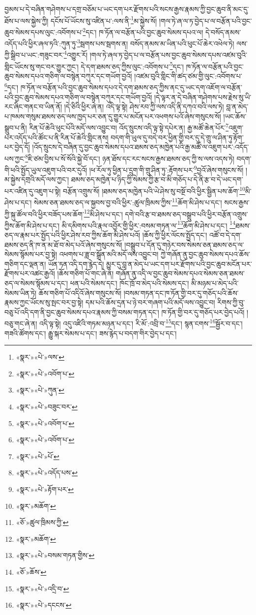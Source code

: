 བྱམས་པ་དེ་བཞིན་གཤེགས་པ་དགྲ་བཅོམ་པ་ཡང་དག་པར་རྫོགས་པའི་སངས་རྒྱས་རྣམས་ཀྱི་བྱང་ཆུབ་ནི་མང་དུ་ཐོས་པ་ལས་སྐྱེས་ཀྱི། དངོས་པོ་ཡོངས་སུ་འཛིན་པ་:ལས་ནི་\footnote{«སྣར་»«པེ་»ལས་}མ་སྐྱེས་སོ། །གལ་ཏེ་ཞ་ལ་ཏ་བྱེད་པ་ལ་བརྩོན་པའི་བྱང་ཆུབ་སེམས་དཔས་ལུང་:འབོགས་པ་\footnote{«སྣར་»«པེ་»འབོག་པ་}དང་། ཁ་ཏོན་ལ་བརྩོན་པའི་བྱང་ཆུབ་སེམས་དཔའ་ལ། དེ་བསོད་ནམས་འདོད་པའི་ཕྱིར་ཞལ་ཏའི་:ཀུན་ཏུ་\footnote{«སྣར་»«པེ་»ཀུན་}སྦགས་པས་སྦགས་ན། བསོད་ནམས་མ་ཡིན་པའི་ཕུང་པོ་ཆེར་འཕེལ་ཏེ། ལས་ཀྱི་སྒྲིབ་པ་ཡང་:གཟུང་བར་\footnote{«སྣར་»«པེ་»བཟུང་བར་}འགྱུར་རོ། །གལ་ཏེ་ཞལ་ཏ་བྱེད་པ་ལ་བརྩོན་པས་བྱང་ཆུབ་སེམས་དཔས་འཛམ་བུའི་གླིང་ཡོངས་སུ་གང་བར་གྱུར་ཀྱང་། དེ་དག་ཐམས་ཅད་ཀྱིས་ལུང་:འབོགས་པ་\footnote{«སྣར་»«པེ་»འབོག་པ་}དང་། ཁ་ཏོན་ལ་བརྩོན་པའི་བྱང་ཆུབ་སེམས་དཔའ་གཅིག་ལ་བསྙེན་བཀུར་དང་གཡོག་བྱའོ། །འཛམ་བུའི་གླིང་གི་ཚད་ཙམ་གྱི་ལུང་:འབོགས་པ་\footnote{«སྣར་»«པེ་»འབོག་པ་}དང་། ཁ་ཏོན་ལ་བརྩོན་པའི་བྱང་ཆུབ་སེམས་དཔའ་དེ་དག་ཐམས་ཅད་ཀྱིས་ནང་དུ་ཡང་དག་འཇོག་ལ་བརྩོན་པའི་བྱང་ཆུབ་སེམས་དཔའ་གཅིག་ལ་བསྙེན་བཀུར་དང་གཡོག་བྱའོ། །དེ་ལྟར་ན་དེ་བཞིན་གཤེགས་པས་རྗེས་སུ་ཡི་རང་ཞིང་གནང་བ་ཡིན་ནོ། །དེ་ཅིའི་ཕྱིར་ཞེ་ན། འདི་ལྟ་སྟེ། ཤེས་རབ་ཀྱི་ལས་འདི་ནི་དཀའ་བའི་ལས་ཏེ། བླ་ན་མེད་པ་ཁམས་གསུམ་ཐམས་ཅད་ལས་ཁྱད་པར་ཅན་དུ་གྱུར་པ་མངོན་པར་འཕགས་པའོ་ཞེས་གསུངས་སོ། །ཡང་ཆོས་སྒྲུབ་པ་ནི། རིན་པོ་ཆེའི་ཕུང་པོའི་མདོ་ལས་འབྱུང་བ། འོད་སྲུངས་འདི་ལྟ་སྟེ་དཔེར་ན། རྒྱ་མཚོ་ཆེན་པོར་\footnote{«སྣར་»«པེ་»པོ་}འཇུག་པར་འདོད་པའི་ཚོང་པ་ནི་རིན་པོ་ཆེའི་གླིང་ནས། བདག་གི་ཡུལ་དུ་བདེ་བར་ཕྱིན་གྱི་བར་དུ་དེ་གྲུ་ལ་ཤིན་ཏུ་རྟོག་པར་བྱེད་དོ། །འོད་སྲུངས་དེ་བཞིན་དུ་བྱང་ཆུབ་སེམས་དཔའ་ཐམས་ཅད་མཁྱེན་པའི་རྒྱ་མཚོ་ལ་འཇུག་པར་:འདོད་པས་ཀྱང་\footnote{«སྣར་»«པེ་»འདོད་པས་}ཇི་ཙམ་བྱིས་པ་སོ་སོའི་སྐྱེ་བོ་དང་། ཉན་ཐོས་དང་རང་སངས་རྒྱས་ཐམས་ཅད་ཀྱི་ས་ལས་འདས་ཏེ། བདག་གི་ཕའི་སྤྱོད་ཡུལ་འཇུག་པའི་བར་དུའོ། །ཕ་རོལ་ཏུ་ཕྱིན་པ་དྲུག་གི་གྲུ་ཤིན་ཏུ་:རྟོགས་པར་\footnote{«སྣར་»«པེ་»རྟོག་པར་}བྱའོ་ཞེས་གསུངས་སོ། །མ་སྐྱེས་དགྲའི་མདོ་ལས་ཀྱང་། ཐམས་ཅད་མཁྱེན་པ་ཉིད་ཀྱི་སེམས་ཀྱི་རྩ་བ་མི་གཅོད་པ་དེ་ནི་རྩ་བ་དེ་ཡང་དག་པར་འཛིན་དུ་འཇུག་པ་སྟེ། བརྩོན་འགྲུས་སོ། །ཐམས་ཅད་མཁྱེན་པའི་ཡེ་ཤེས་སུ་བསྔོ་བའི་ཕྱིར་སྦྱིན་པས་ཆོག་\footnote{«སྣར་»མཆོག་}མི་ཤེས་པ་དང་། སེམས་ཅན་ཐམས་ཅད་ལ་སྐྱབས་བྱ་བའི་ཕྱིར་:ཚུལ་ཁྲིམས་ཀྱིས་\footnote{«ཅོ་»ཚུལ་ཁྲིམས་ཀྱི་}ཆོག་མི་ཤེས་པ་དང་། སངས་རྒྱས་ཀྱི་སྐུ་ཚོལ་བའི་ཕྱིར་བཟོད་པས་ཆོག་\footnote{«སྣར་»མཆོག་}མི་ཤེས་པ་དང་། དགེ་བའི་རྩ་བ་ཐམས་ཅད་བསྒྲུབ་པའི་ཕྱིར་བརྩོན་འགྲུས་ཀྱིས་ཆོག་མི་ཤེས་པ་དང་། མི་དམིགས་པའི་རྣལ་འབྱོར་གྱི་ཕྱིར་:བསམ་གཏན་ལ་\footnote{«སྣར་»«པེ་»བསམ་གཏན་གྱིས་}ཆོག་མི་ཤེས་པ་དང་། \footnote{«ཅོ་»ཆོས་}ཐམས་ཅད་ལ་རྣམ་པར་སྤྱོད་པའི་ཕྱིར་ཤེས་རབ་ཀྱིས་ཆོག་མི་ཤེས་པའོ། །ཆོས་ཀྱི་ཕྱིར་ལོངས་སྤྱོད་དང་། འཚོ་བ་དེ་དག་ཐམས་ཅད་ནི་ཁ་ན་མ་ཐོ་བ་མེད་པའོ་ཞེས་གསུངས་སོ། །བསྒྲུབ་པ་དོན་དུ་གཉེར་བས་སེམས་ཅན་ཐམས་ཅད་ལ་སེམས་སྙོམས་པར་བྱ་སྟེ། འཕགས་པ་ཟླ་བ་སྒྲོན་མའི་མདོ་ལས་འབྱུང་བ། ཀྱེ་གཞོན་ནུ་བྱང་ཆུབ་སེམས་དཔའ་ཆོས་གཅིག་དང་ལྡན་ན། ཡོན་ཏན་འདི་དག་རྙེད་དེ། མྱུར་དུ་བླ་ན་མེད་པ་ཡང་དག་པར་རྫོགས་པའི་བྱང་ཆུབ་མངོན་པར་རྫོགས་པར་འཚང་རྒྱའོ། །ཆོས་གཅིག་པོ་གང་ཞེ་ན། གཞོན་ནུ་འདི་ལ་བྱང་ཆུབ་སེམས་དཔའ་སེམས་ཅན་ཐམས་ཅད་ལ་སེམས་སྙོམས་པ་དང་། ཕན་པའི་སེམས་དང་། ཁོང་ཁྲོ་བ་མེད་པའི་སེམས་དང་། མི་མཉམ་པ་མེད་པའི་སེམས་ཡིན་ཏེ། ཆོས་གཅིག་པོ་འདིའོ་ཞེས་གསུངས་སོ། །བསམ་གཏན་དང་ཁ་ཏོན་གྱི་བར་དུ་གཅོད་པའི་ཆོས་རྣམས་ཀྱང་ཡོངས་སུ་སྤང་བར་བྱ་སྟེ། དམ་པའི་ཆོས་དྲན་པ་ཉེ་བར་གཞག་པའི་མདོ་ལས་འབྱུང་བ། རིགས་ཀྱི་བུ་བཅུ་པོ་འདི་དག་ནི་བྱང་ཆུབ་སེམས་དཔའ་རྣམས་ཀྱི་བསམ་གཏན་དང་། ཁ་ཏོན་གྱི་བར་དུ་གཅོད་པར་བྱེད་པའོ། །བཅུ་གང་ཞེ་ན། འདི་ལྟ་སྟེ། འདུ་འཛིའི་གཏམ་མཉན་པ་དང་། རི་མོ་:འབྲི་བ་\footnote{«སྣར་»«པེ་»འདྲི་བ་}དང་། སྙན་ངགས་\footnote{«སྣར་»«པེ་»དངངས་}སྦྱོར་བ་དང་། གཟའི་ཚོགས་དང་། རྒྱུ་སྐར་སེམས་པ་དང་། ཟས་རྙེད་པ་བདག་གིར་བྱེད་པ་དང་། 